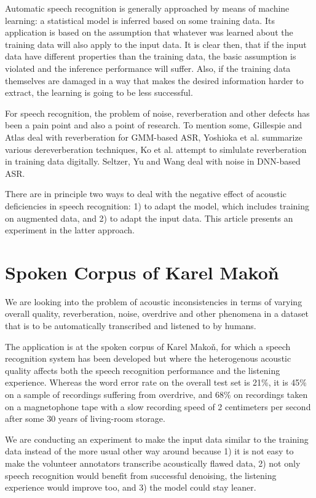 \documentclass[runningheads,a4paper]{llncs}
\begin{document}
Automatic speech recognition is generally approached by means of machine
learning: a statistical model is inferred based on some training data. Its
application is based on the assumption that whatever was learned about the training
data will also apply to the input data. It is clear then, that if the input
data have different properties than the training data, the basic assumption is
violated and the inference performance will suffer.
Also, if the training data themselves are damaged in a way that makes the desired
information harder to extract, the learning is going to be less successful.

For speech recognition, the problem of noise, reverberation and other defects
has been a pain point and also a point of research. To mention some, Gillespie
and Atlas\cite{gillespie2002diversity} deal with reverberation for
GMM-based ASR, Yoshioka et al.\cite{reverbmagazine} summarize various
dereverberation techniques, Ko et al.\cite{reverbaugment} attempt to
simlulate reverberation in training data digitally. Seltzer, Yu and
Wang\cite{dnnnoiserobust} deal with noise in DNN-based ASR.

There are in principle two ways to deal with the negative effect of acoustic
deficiencies in speech recognition: 1) to adapt the model, which includes
training on augmented data, and 2) to adapt the input data. This article
presents an experiment in the latter approach.

\section{Spoken Corpus of Karel Makoň}

We are looking into the problem of acoustic inconsistencies in terms of varying
overall quality, reverberation, noise, overdrive and other phenomena in a
dataset that is to be automatically transcribed and listened to by humans.

The application is at the spoken corpus of Karel Makoň\cite{makondata}, for which
a speech recognition system has been developed\cite{kruuza2012making} but where
the heterogenous acoustic quality affects both the speech recognition
performance and the listening experience. Whereas the word error rate on the
overall test set is 21\%, it is 45\% on a sample of recordings suffering from
overdrive, and 68\% on recordings taken on a magnetophone tape with a slow
recording speed of 2 centimeters per second after some 30 years of living-room
storage.

We are conducting an experiment to make the input data similar to the training
data instead of the more usual other way around because 1) it is not easy to
make the volunteer annotators transcribe acoustically flawed data, 2) not only
speech recognition would benefit from successful denoising, the listening
experience would improve too, and 3) the model could stay leaner.
\end{document}
